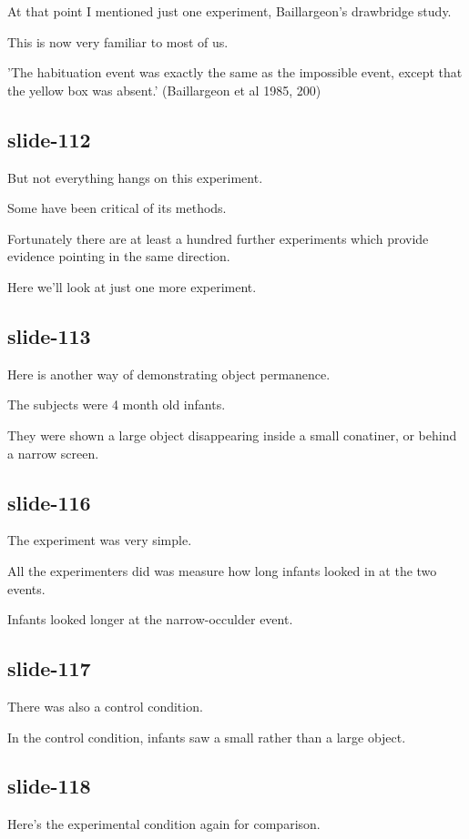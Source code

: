 \documentclass[12pt,\papersize]{extarticle}
\begin{document}
At that point I mentioned just one experiment, Baillargeon's drawbridge study.
 
This is now very familiar to most of us.
 
'The habituation event was exactly the same as the impossible event, except that the yellow box was absent.' (Baillargeon et al 1985, 200)
 
\subsection{slide-112}
But not everything hangs on this experiment.
 
Some have been critical of its methods.
 
Fortunately there are at least a hundred further experiments which provide evidence pointing in the same direction.
 
Here we'll look at just one more experiment.
 
\subsection{slide-113}
Here is another way of demonstrating object permanence.
 
The subjects were 4 month old infants.
 
They were shown a large object disappearing inside a small conatiner, or behind a narrow screen.
 
\subsection{slide-116}
The experiment was very simple.
 
All the experimenters did was measure how long infants looked in at the two events.
 
Infants looked longer at the narrow-occulder event.
 
\subsection{slide-117}
There was also a control condition.
 
In the control condition, infants saw a small rather than a large object.
 
\subsection{slide-118}
Here’s the experimental condition again for comparison.
 
\end{document}
